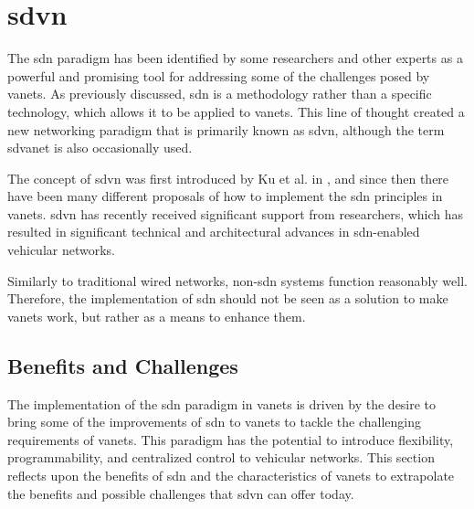 
%

\chapter[Software Defined Vehicular Network]{\gls{sdvn}}
\label{cha:sdvn}

The \gls{sdn} paradigm has been identified by some researchers and other experts as a powerful and promising tool for addressing some of the challenges posed by \glspl{vanet}\cite{smida_efficient_2020}. As previously discussed, \gls{sdn} is a methodology rather than a specific technology, which allows it to be applied to \glspl{vanet}. This line of thought created a new networking paradigm that is primarily known as \gls{sdvn}, although the term \gls{sdvanet} is also occasionally used.

The concept of \gls{sdvn} was first introduced by Ku et al. in \cite{ku_towards_2014}, and since then there have been many different proposals of how to implement the \gls{sdn} principles in \glspl{vanet}. \gls{sdvn} has recently received significant support from researchers, which has resulted in significant technical and architectural advances in \gls{sdn}-enabled vehicular networks\cite{bhatia_software_2019}. 

Similarly to traditional wired networks, non-\gls{sdn} systems function reasonably well. Therefore, the implementation of \gls{sdn} should not be seen as a solution to make \glspl{vanet} work, but rather as a means to enhance them.

\section{Benefits and Challenges}

The implementation of the \gls{sdn} paradigm in \glspl{vanet} is driven by the desire to bring some of the improvements of \gls{sdn} to \glspl{vanet} to tackle the challenging requirements of \glspl{vanet}. This paradigm has the potential to introduce flexibility, programmability, and centralized control to vehicular networks\cite{bhatia_software_2019}. This section reflects upon the benefits of \gls{sdn} and the characteristics of \glspl{vanet} to extrapolate the benefits and possible challenges that \gls{sdvn} can offer today.

